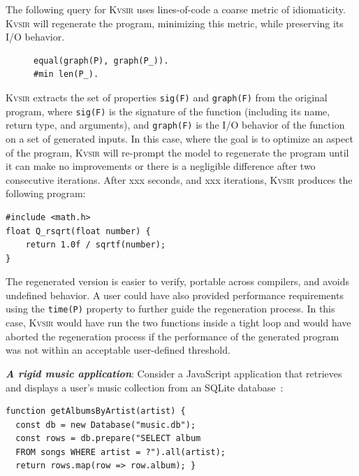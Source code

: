 \documentclass[noacm,sigplan]{acmart}
\newcommand{\sys}{{\scshape Kv{\textalpha}sir}\xspace}
\newcommand{\heading}[1]{\vspace{2pt}\noindent\textbf{\emph{#1}}:\enspace}
\newcommand{\ttt}[1]{\texttt{#1}\xspace}
\newcommand{\xxx}{\colorbox{red!30}{xxx}\xspace}
\begin{document}
The following query for \sys uses lines-of-code a coarse metric of
idiomaticity. \sys will regenerate the program, minimizing this metric, while
preserving its I/O behavior.
\begin{figure}
  \vspace{-5pt}
  \begin{verbatim}
equal(graph(P), graph(P_)).
#min len(P_).
  \end{verbatim}
\end{figure}
\sys extracts the set of properties \ttt{sig(F)} and \ttt{graph(F)} from the original program, where \texttt{sig(F)} is the
signature of the function (including its name, return type, and arguments), and \texttt{graph(F)} is the I/O behavior of the function
on a set of generated inputs.
In this case, where the goal is to optimize an aspect of the program, \sys will re-prompt
the model to regenerate the program until it can make no improvements or there is a negligible difference after two consecutive iterations.
After \xxx seconds, and \xxx iterations, \sys produces the following program:
\begin{verbatim}
#include <math.h>
float Q_rsqrt(float number) {
    return 1.0f / sqrtf(number);
}
\end{verbatim}
The regenerated version is easier to verify, portable across compilers, and
avoids undefined behavior.
A user could have also provided performance requirements using 
the \ttt{time(P)} property to further guide the regeneration process.
In this case, \sys would have run the two functions inside a tight loop and 
would have aborted the regeneration process if the performance of the generated
program was not within an acceptable user-defined threshold.

\heading{A rigid music application}
Consider a JavaScript application that retrieves and displays a user's music
collection from an SQLite database~\cite{codewithsadeemusicplayer, beets}:

\begin{verbatim}
function getAlbumsByArtist(artist) {
  const db = new Database("music.db");
  const rows = db.prepare("SELECT album
  FROM songs WHERE artist = ?").all(artist);
  return rows.map(row => row.album); }
\end{verbatim}
\end{document}
